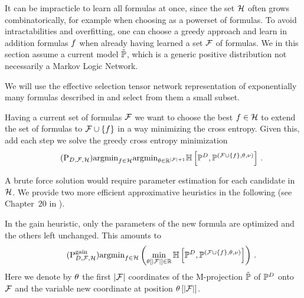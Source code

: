 

It can be impracticle to learn all formulas at once, since the set $\mathcal{H}$ often grows combinatorically, for example when choosing as a powerset of formulas.
To avoid intractabilities and overfitting, one can choose a greedy approach and learn in addition formulas $f$ when already having learned a set $\mathcal{F}$ of formulas.
We in this section assume a current model $\tilde{\mathbb{P}}$, which is a generic positive distribution not necessarily a Markov Logic Network. %

% 
We will use the effective selection tensor network representation of exponentially many formulas described in  and select from them a small subset.




Having a current set of formulas $\mathcal{F}$ we want to choose the best $f\in\mathcal{H}$ to extend the set of formulas to $\mathcal{F}\cup\{f\}$ in a way minimizing the cross entropy.
Given this, add each step we solve the greedy cross entropy minimization
\begin{align}\label{prob:perfectGreedy}\tag{$\mathrm{P}_{\datamap,\formulaset,\fselectionmap}$}
	\argmin_{\formula\in\fselectionmap} \argmin_{\canparam\in\rr^{\cardof{\formulaset}+1}}
	\centropyof{\empdistribution}{\expdistof{(\formulaset\cup\{\formula\},\canparam,\basemeasure)}} \, .
\end{align}


A brute force solution would require parameter estimation for each candidate in $\mathcal{H}$.
We provide two more efficient approximative heuristics in the following (see Chapter~20 in \cite{koller_probabilistic_2009}).



In the gain heuristic, only the parameters of the new formula are optimized and the others left unchanged.
This amounts to
\begin{align}\label{prob:greedyGain}\tag{$\mathrm{P}^{\mathrm{gain}}_{\datamap,\formulaset,\fselectionmap}$}
	\argmin_{\formula\in\fselectionmap} \left ( \min_{\canparamat{\cardof{\formulaset}}\in\rr}
	\centropyof{\empdistribution}{\expdistof{(\formulaset\cup\{\formula\},\canparam,\basemeasure)}} \right) \, .
\end{align}
Here we denote by $\theta$ the first $\left|\mathcal{F}\right|$ coordinates of the M-projection $\tilde{\mathbb{P}}$  of $\mathbb{P}^{D}$ onto $\mathcal{F}$ and the variable new coordinate at position $\theta\left[\left|\mathcal{F}\right|\right]$.

